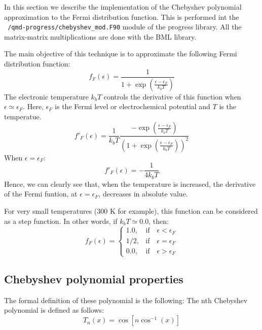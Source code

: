 
\newcommand{\coef}{\textbf{c}}  
  
In this section we describe the implementation of the Chebyshev polynomial approximation to the Fermi distribution function. 
This is performed int the \texttt{~/qmd-progress/chebyshev\_mod.F90} module of the progress library. All the matrix-matrix multiplications are done with the BML library. 

The main objective of this technique is to approximate the following Fermi distribution function:
%
\begin{equation}
  f_F(\epsilon)= \frac{1}{1+\exp(\frac{\epsilon-\epsilon_F}{k_bT})}
  \label{Fermi}
\end{equation}
%
The electronic temperature $k_bT$ controls the derivative of this function when $\epsilon \simeq \epsilon_F$.
Here, $\epsilon_F$ is the Fermi level or electrochemical potential and $T$ is the temperatue.
%
\begin{equation}
  f'_F(\epsilon)= \frac{1}{k_bT}  
  \frac{-\exp{(\frac{\epsilon-\epsilon_F}{k_bT})}}{\left(1+\exp(\frac{\epsilon-\epsilon_F}{k_bT})\right)^2}
  \label{FermiD}
\end{equation}
%
When $\epsilon=\epsilon_F$: 
%
\begin{equation}
  f'_F(\epsilon)= -\frac{1}{4k_bT}  
  \label{FermiDEf}
\end{equation}
%
Hence, we can clearly see that, when the temperature is increased, the derivative of the Fermi funtion, at $\epsilon=\epsilon_F$, decreases in absolute value.  

For very small temperatures (300 K for example), this function can be considered as a step function. In other words, if $k_bT \simeq 0.0$, then:
%
\begin{equation}
  f_F(\epsilon) = \left\{\begin{array}{clrr}
    1.0, & \mathrm{if} \quad  \epsilon < \epsilon_F \\
    1/2, &  \mathrm{if}  \quad  \epsilon = \epsilon_F \\
    0.0, &  \mathrm{if}  \quad  \epsilon >\epsilon_F
  \end{array}\right.
  \label{adj}
\end{equation}

\subsection{Chebyshev polynomial properties}

The formal definition of these polynomial is the following: The nth Chebyshev polynomial is defined as follows: 
%
\begin{equation}
  T_n(x)= \cos\left[n \cos^{-1}(x) \right]
  \label{nthcheb}
\end{equation}

